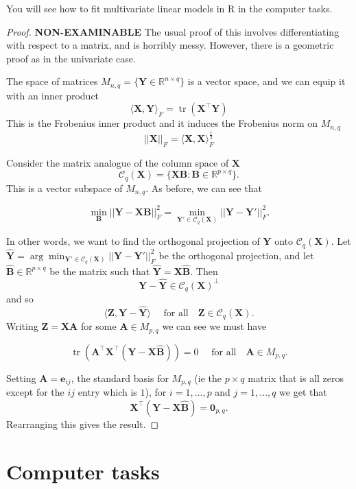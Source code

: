 \documentclass[
]{book}
\theoremstyle{definition}
\theoremstyle{definition}
\theoremstyle{definition}
\theoremstyle{definition}
\theoremstyle{remark}
\begin{document}
You will see how to fit multivariate linear models in R in the computer tasks.

\begin{proof}
\textbf{NON-EXAMINABLE}
The usual proof of this involves differentiating with respect to a matrix, and is horribly messy. However, there is a geometric proof as in the univariate case.

The space of matrices \(M_{n,q} = \{\mathbf Y\in \mathbb{R}^{n \times q} \}\) is a vector space, and we can equip it with an inner product
\[\langle \mathbf X, \mathbf Y\rangle_F = \operatorname{tr}(\mathbf X^\top \mathbf Y)\]
This is the Frobenius inner product and it induces the Frobenius norm on \(M_{n,q}\)
\[||\mathbf X||_F = \langle \mathbf X, \mathbf X\rangle_F^{\frac{1}{2}}\]

Consider the matrix analogue of the column space of \(\mathbf X\)
\[\mathcal{C}_q(\mathbf X)  =\{\mathbf X\mathbf B: \mathbf B\in \mathbb{R}^{p\times q}\}.\]
This is a vector subspace of \(M_{n,q}\). As before, we can see that

\[\min_{\mathbf B} ||\mathbf Y-\mathbf X\mathbf B||_F^2=\min_{\mathbf Y' \in \mathcal{C}_q(\mathbf X)} ||\mathbf Y- \mathbf Y'||_F^2.\]

In other words, we want to find the orthogonal projection of \(\mathbf Y\) onto \(\mathcal{C}_q(\mathbf X)\). Let \(\hat{\mathbf Y} = \arg \min_{\mathbf Y' \in \mathcal{C}_q(\mathbf X)} ||\mathbf Y- \mathbf Y'||_F^2\) be the orthogonal projection, and let \(\hat{\mathbf B}\in \mathbb{R}^{p \times q}\) be the matrix such that \(\hat{\mathbf Y}=\mathbf X\hat{\mathbf B}\). Then
\[\mathbf Y-\hat{\mathbf Y} \in \mathcal{C}_q(\mathbf X)^\perp\]
and so
\[\langle \mathbf Z, \mathbf Y-\hat{\mathbf Y}\rangle \quad \mbox{ for all}\quad \mathbf Z\in \mathcal{C}_q(\mathbf X).\]
Writing \(\mathbf Z= \mathbf X\mathbf A\) for some \(\mathbf A\in M_{p,q}\) we can see we must have

\[\operatorname{tr}(\mathbf A^\top \mathbf X^\top(\mathbf Y-\mathbf X\hat{\mathbf B}))=0 \quad \mbox{ for all}\quad \mathbf A\in M_{p,q}.\]

Setting \(\mathbf A=\mathbf e_{ij}\), the standard basis for \(M_{p,q}\) (ie the \(p\times q\) matrix that is all zeros except for the \(ij\) entry which is \(1\)), for \(i=1,\ldots, p\) and \(j=1, \ldots,q\) we get that
\[\mathbf X^\top(\mathbf Y-\mathbf X\hat{\mathbf B})={\boldsymbol 0}_{p,q}.\]
Rearranging this gives the result.
\end{proof}

\hypertarget{computer-tasks-6}{%
\section{Computer tasks}\label{computer-tasks-6}}
\end{document}
